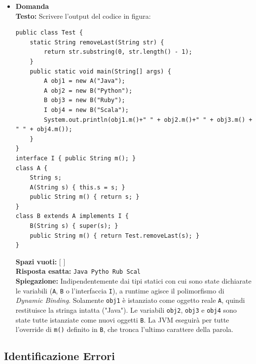 \documentclass[12pt, a4paper]{article}
\begin{document}
\begin{itemize}
    \item {}\textbf{Domanda \thedomanda} \\
    \textbf{Testo:} Scrivere l'output del codice in figura:
\begin{verbatim}
public class Test {
    static String removeLast(String str) {
        return str.substring(0, str.length() - 1);
    }
    public static void main(String[] args) {
        A obj1 = new A("Java");
        A obj2 = new B("Python");
        B obj3 = new B("Ruby");
        I obj4 = new B("Scala");
        System.out.println(obj1.m()+" " + obj2.m()+" " + obj3.m() + " " + obj4.m());
    }
}
interface I { public String m(); }
class A {
    String s;
    A(String s) { this.s = s; }
    public String m() { return s; }
}
class B extends A implements I {
    B(String s) { super(s); }
    public String m() { return Test.removeLast(s); }
}
\end{verbatim}
    \textbf{Spazi vuoti:} [ \hspace{2cm} ] \\
    \textbf{Risposta esatta:} \texttt{Java Pytho Rub Scal} \\
    \textbf{Spiegazione:} Indipendentemente dai tipi statici con cui sono state dichiarate le variabili (\texttt{A}, \texttt{B} o l'interfaccia \texttt{I}), a runtime agisce il polimorfismo di \textit{Dynamic Binding}. Solamente \texttt{obj1} è istanziato come oggetto reale \texttt{A}, quindi restituisce la stringa intatta ("Java"). Le variabili \texttt{obj2}, \texttt{obj3} e \texttt{obj4} sono state tutte istanziate come nuovi oggetti \texttt{B}. La JVM eseguirà per tutte l'override di \texttt{m()} definito in \texttt{B}, che tronca l'ultimo carattere della parola.
    \vspace{0.5cm}
\end{itemize}

\newpage
\subsection{Identificazione Errori}
\end{document}
